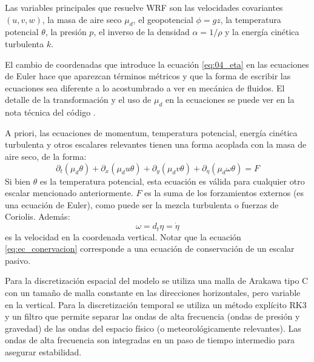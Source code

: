 Las variables principales que resuelve WRF son las velocidades covariantes $(u,v,w)$, la masa de aire seco $\mu_d$, el geopotencial $\phi = gz$, la temperatura potencial $\theta$, la presión $p$, el inverso de la densidad $\alpha= 1/\rho$ y la energía cinética turbulenta $k$. 

El cambio de coordenadas que introduce la ecuación \ref{eq:04_eta} en las ecuaciones de Euler hace que aparezcan términos métricos y que la forma de escribir las ecuaciones sea diferente a lo acostumbrado a ver en mecánica de fluidos. El detalle de la transformación y el uso de $\mu_d$ en la ecuaciones se puede ver en la nota técnica del código \cite{https://doi.org/10.5065/d68s4mvh}.

A priori, las ecuaciones de momentum, temperatura potencial, energía cinética turbulenta y otros escalares relevantes tienen una forma acoplada con la masa de aire seco, de la forma:
\begin{equation}\label{eq:ec_conervacion}
\partial_t (\mu_d\theta) + \partial_x(\mu_d u \theta)+\partial_y(\mu_d v \theta)+\partial_\eta (\mu_d \omega \theta) = F
\end{equation}
Si bien $\theta$ es la temperatura potencial, esta ecuación es válida para cualquier otro escalar mencionado anteriormente.
$F$ es la suma de los forzamientos externos (es una ecuación de Euler), como puede ser la mezcla turbulenta o fuerzas de Coriolis. Además:
\begin{equation}
\omega = d_t\eta = \dot{\eta}
\end{equation}
es la velocidad en la coordenada vertical. Notar que la ecuación \ref{eq:ec_conervacion} corresponde a una ecuación de conservación de un escalar pasivo.

Para la discretización espacial del modelo se utiliza una malla de Arakawa tipo C con un tamaño de malla constante en las direcciones horizontales, pero variable en la vertical. Para la discretización temporal se utiliza un método explícito RK3 y un filtro que permite separar las ondas de alta frecuencia (ondas de presión y gravedad) de las ondas del espacio físico (o meteorológicamente relevantes). Las ondas de alta frecuencia son integradas en un paso de tiempo intermedio para asegurar estabilidad.

